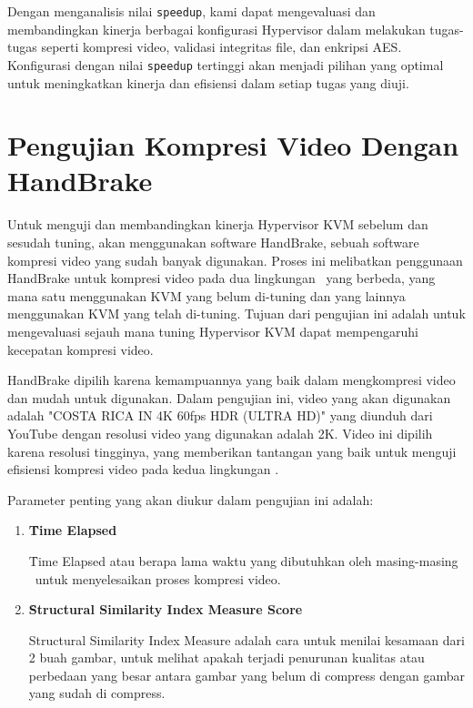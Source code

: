 \hfill

Dengan menganalisis nilai \texttt{speedup}, kami dapat mengevaluasi dan membandingkan kinerja berbagai konfigurasi Hypervisor dalam melakukan tugas-tugas seperti kompresi video, validasi integritas file, dan enkripsi AES. Konfigurasi dengan nilai \texttt{speedup} tertinggi akan menjadi pilihan yang optimal untuk meningkatkan kinerja dan efisiensi dalam setiap tugas yang diuji.

\iffalse
    \section{Pengujian Kompresi Video Dengan HandBrake}
    Untuk menguji dan membandingkan kinerja Hypervisor KVM sebelum dan sesudah tuning, {\saya} akan menggunakan software HandBrake, sebuah software kompresi video yang sudah banyak digunakan. Proses ini melibatkan penggunaan HandBrake untuk kompresi video pada dua lingkungan \vm\ yang berbeda, yang mana satu menggunakan KVM yang belum di-tuning dan yang lainnya menggunakan KVM yang telah di-tuning. Tujuan dari pengujian ini adalah untuk mengevaluasi sejauh mana tuning Hypervisor KVM dapat mempengaruhi kecepatan kompresi video.

    HandBrake dipilih karena kemampuannya yang baik dalam mengkompresi video dan mudah untuk digunakan\cite{Folgar2014eg}. Dalam pengujian ini, video yang akan digunakan adalah "COSTA RICA IN 4K 60fps HDR (ULTRA HD)" yang diunduh dari YouTube dengan resolusi video yang digunakan adalah 2K. Video ini dipilih karena resolusi tingginya, yang memberikan tantangan yang baik untuk menguji efisiensi kompresi video pada kedua lingkungan \vm.

    Parameter penting yang akan diukur dalam pengujian ini adalah:

    \begin{enumerate}
        \item \textbf{\f{Time Elapsed}}

              \f{Time Elapsed} atau berapa lama waktu yang dibutuhkan oleh masing-masing \vm\ untuk menyelesaikan proses kompresi video.

        \item \textbf{\f{Structural Similarity Index Measure Score}}

              Structural Similarity Index Measure adalah cara untuk menilai kesamaan dari 2 buah gambar, untuk melihat apakah terjadi penurunan kualitas atau perbedaan yang besar antara gambar yang belum di compress dengan gambar yang sudah di compress.
    \end{enumerate}


